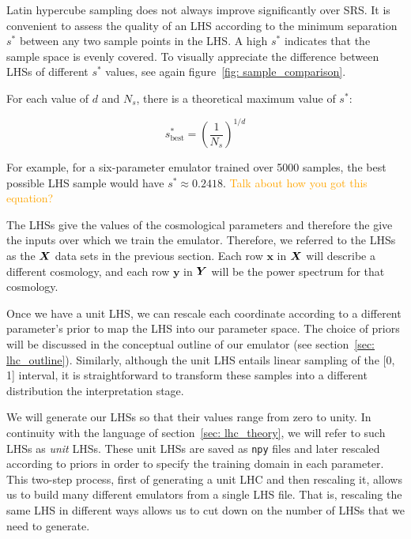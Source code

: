 Latin hypercube sampling does not always improve significantly over SRS. It is 
convenient to
assess the quality of an LHS according to the minimum separation $s^*$ 
between any two sample points in the LHS. A high $s^*$ indicates that 
the sample space is evenly covered. To visually appreciate the difference 
between LHSs of different $s^*$ values, see again
figure~\ref{fig: sample_comparison}.

For each value of $d$ and $N_s$, there is a theoretical maximum value of
$s^*$:

\begin{equation}
\label{eq: best_lhs_sep}
s^*_\text{best} = \left( \frac{1}{N_s} \right)^{1 / d}
\end{equation}

For example, for a six-parameter emulator trained over 5000 samples, the best
possible LHS sample would have $s^* \approx 0.2418$.
\textcolor{orange}{Talk about how you got this equation?}

The LHSs give the values of the cosmological parameters and therefore
the give the inputs over which we train the emulator.
Therefore, we referred to the LHSs as the
$\bm{X}$ data sets in the previous section. Each
row $\bm{x}$ in $\bm{X}$ will describe a different cosmology, and each
row $\bm{y}$ in $\bm{Y}$ will be the power spectrum for that cosmology.

Once we have a unit LHS, we can rescale each coordinate according to a 
different parameter's prior to map the LHS into our parameter space. The
choice of priors will be discussed in the conceptual outline of our
emulator (see section~\ref{sec: lhc_outline}). Similarly,
although the unit LHS entails linear sampling of the [0, 1] interval, it is 
straightforward to transform these samples into a different distribution
the interpretation stage.



We will generate our LHSs so that their values range from zero to unity.
In continuity with the language of section~\ref{sec: lhc_theory}, we will 
refer to such LHSs as \textit{unit} LHSs. These unit LHSs are saved as
\texttt{npy} files and later rescaled according to priors in order to
specify the training
domain in each parameter. This two-step process, first of generating a unit
LHC and then rescaling it, allows us to build many different emulators from a 
single LHS file. That is, rescaling the same LHS in different ways allows us
to cut down on the number of LHSs that we need to generate.

